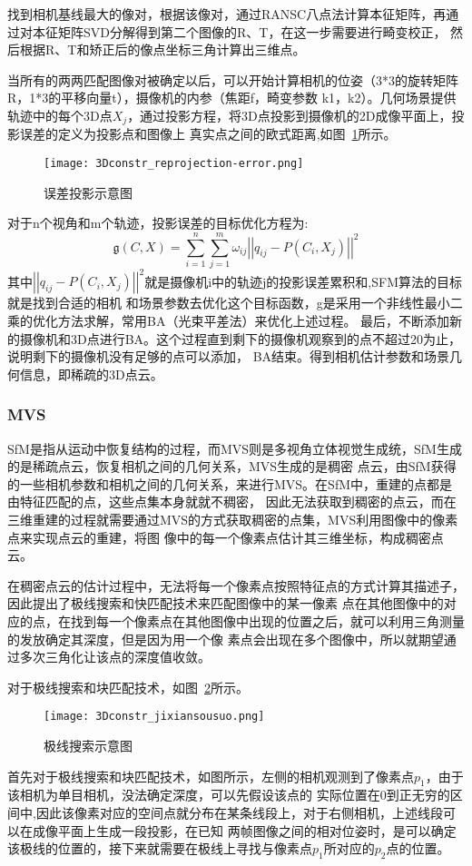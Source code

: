 找到相机基线最大的像对，根据该像对，通过RANSC八点法计算本征矩阵，再通过对本征矩阵SVD分解得到第二个图像的R、T，在这一步需要进行畸变校正，
然后根据R、T和矫正后的像点坐标三角计算出三维点。

当所有的两两匹配图像对被确定以后，可以开始计算相机的位姿（3*3的旋转矩阵R，1*3的平移向量t），摄像机的内参（焦距f，畸变参数
k1，k2）。几何场景提供轨迹中的每个3D点$X_j$，通过投影方程，将3D点投影到摄像机的2D成像平面上，投影误差的定义为投影点和图像上
真实点之间的欧式距离,如图~\ref{fig:3Dconstr_reprojection-error}所示。
\begin{figure}[H] %
  \centering
  \texttt{[image: 3Dconstr\_reprojection-error.png]}
  \caption{误差投影示意图}
  \label{fig:3Dconstr_reprojection-error}
\end{figure}
对于n个视角和m个轨迹，投影误差的目标优化方程为:
\begin{equation}
  \mathfrak g(C,X)=\sum_{i=1}^n\sum_{j=1}^m\omega_{ij}\left|\left|q_{ij}-P(C_i,X_j)\right|\right|^2
\end{equation}
其中$\left|\left|q_{ij}-P(C_i,X_j)\right|\right|^2$就是摄像机i中的轨迹j的投影误差累积和,SFM算法的目标就是找到合适的相机
和场景参数去优化这个目标函数，g是采用一个非线性最小二乘的优化方法求解，常用BA（光束平差法）来优化上述过程。
最后，不断添加新的摄像机和3D点进行BA。这个过程直到剩下的摄像机观察到的点不超过20为止，说明剩下的摄像机没有足够的点可以添加，
BA结束。得到相机估计参数和场景几何信息，即稀疏的3D点云。
\subsubsection{MVS} 
\label{sec:3.2.2.4}
SfM是指从运动中恢复结构的过程，而MVS则是多视角立体视觉生成统，SfM生成的是稀疏点云，恢复相机之间的几何关系，MVS生成的是稠密
点云，由SfM获得的一些相机参数和相机之间的几何关系，来进行MVS。在SfM中，重建的点都是由特征匹配的点，这些点集本身就就不稠密，
因此无法获取到稠密的点云，而在三维重建的过程就需要通过MVS的方式获取稠密的点集，MVS利用图像中的像素点来实现点云的重建，将图
像中的每一个像素点估计其三维坐标，构成稠密点云。

在稠密点云的估计过程中，无法将每一个像素点按照特征点的方式计算其描述子，因此提出了极线搜索和快匹配技术来匹配图像中的某一像素
点在其他图像中的对应的点，在找到每一个像素点在其他图像中出现的位置之后，就可以利用三角测量的发放确定其深度，但是因为用一个像
素点会出现在多个图像中，所以就期望通过多次三角化让该点的深度值收敛。

对于极线搜索和块匹配技术，如图~\ref{fig:3Dconstr_jixiansousuo}所示。
\begin{figure}[H] %
  \centering
  \texttt{[image: 3Dconstr\_jixiansousuo.png]}
  \caption{极线搜索示意图}
  \label{fig:3Dconstr_jixiansousuo}
\end{figure}
首先对于极线搜索和块匹配技术，如图所示，左侧的相机观测到了像素点$p_1$，由于该相机为单目相机，没法确定深度，可以先假设该点的
实际位置在0到正无穷的区间中,因此该像素对应的空间点就分布在某条线段上，对于右侧相机，上述线段可以在成像平面上生成一段投影，在已知
两帧图像之间的相对位姿时，是可以确定该极线的位置的，接下来就需要在极线上寻找与像素点$p_1$所对应的$p_2$点的位置。


